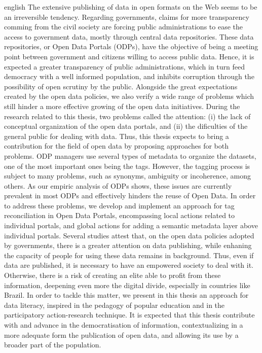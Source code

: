 
\begin{resumo}[Abstract]
 \begin{otherlanguage*}{english}
The extensive publishing of data in open formats on the Web seems to be an irreversible tendency.
Regarding governments, claims for more transparency comming from the civil society are forcing public administrations to ease the access to government data, mostly through central data repositories.
These data repositories, or Open Data Portals (ODPs), have the objective of being a meeting point between government and citizens willing to access public data.
Hence, it is expected a greater transparency of public administrations, which in turn feed democracy with a well informed population, and inhibits corruption through the possibility of open scrutiny by the public.
Alongside the great expectations created by the open data policies, we also verify a wide range of problems which still hinder a more effective growing of the open data initiatives.
During the research related to this thesis, two problems called the attention: (i) the lack of conceptual organization of the open data portals, and (ii) the dificulties of the general public for dealing with data.
Thus, this thesis expects to bring a contribution for the field of open data by proposing approaches for both problems.
ODP managers use several types of metadata to organize the datasets, one of the most important ones being the tags.
However, the tagging process is subject to many problems, such as synonyms, ambiguity or incoherence, among others.
As our empiric analysis of ODPs shows, these issues are currently prevalent in most ODPs and effectively hinders the reuse of Open Data.
In order to address these problems, we develop and implement an approach for tag reconciliation in Open Data Portals, encompassing local actions related to individual portals, and global actions for adding a semantic metadata layer above individual portals.
Several studies attest that, on the open data policies adopted by governments, there is a greater attention on data publishing, while enhaning the capacity of people for using these data remains in background. 
Thus, even if data are published, it is necessary to have an empowered society to deal with it.
Otherwise, there is a risk of creating an elite able to profit from these information, deepening even more the digital divide, especially in countries like Brazil.
In order to tackle this matter, we present in this thesis an approach for data literacy, inspired in the pedagogy of popular education and in the participatory action-research technique.
It is expected that this thesis contribute with and advance in the democratisation of information, contextualizing in a more adequate form the publication of open data, and allowing its use by a broader part of the population.



\end{otherlanguage*}
\end{resumo}
